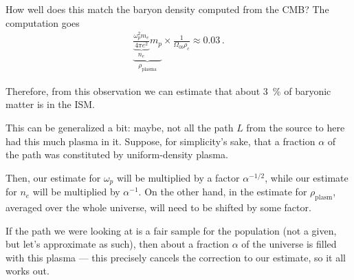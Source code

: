\documentclass[main.tex]{subfiles}
\begin{document}
\begin{extracontent}
How well does this match the baryon density computed from the CMB? 
The computation goes  
%
\begin{align}
\underbrace{\underbrace{\frac{\omega _p^2 m_e}{4 \pi e^2}}_{n_e} m_p}_{\rho _{\text{plasma}}} \times \frac{1}{\Omega _{0b} \rho _c} \approx 0.03
\,.
\end{align}

Therefore, from this observation we can estimate that about \SI{3}{\percent} of baryonic matter is in the ISM. 

This can be generalized a bit: maybe, not all the path \(L\) from the source to here had this much plasma in it. 
Suppose, for simplicity's sake, that a fraction \(\alpha \) of the path was constituted by uniform-density plasma. 

Then, our estimate for \(\omega _p\) will be multiplied by a factor \(\alpha^{-1/2}\), while our estimate for \(n_e\) will be multiplied by \(\alpha^{-1}\). 
On the other hand, in the estimate for \(\rho _{\text{plasm}}\), averaged over the whole universe, will need to be shifted by some factor. 

If the path we were looking at is a fair sample for the population (not a given, but let's approximate as such), then about a fraction \(\alpha \) of the universe is filled with this plasma --- this precisely cancels the correction to our estimate, so it all works out. 
\end{extracontent}
\end{document}
